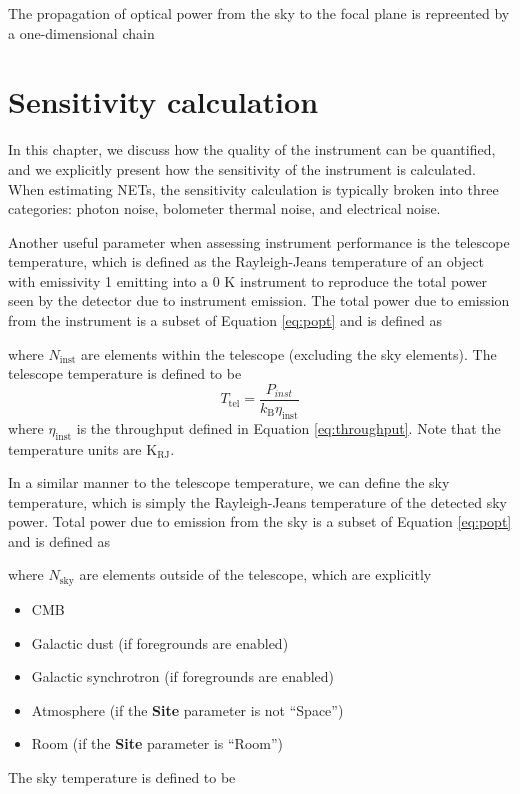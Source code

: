 The propagation of optical power from the sky to the focal plane is repreented by a one-dimensional chain


\section{Sensitivity calculation}

In this chapter, we discuss how the quality of the instrument can be quantified, and we explicitly present how the sensitivity of the instrument is calculated. When estimating NETs, the sensitivity calculation is typically broken into three categories: photon noise, bolometer thermal noise, and electrical noise.

Another useful parameter when assessing instrument performance is the telescope temperature, which is defined as the Rayleigh-Jeans temperature of an object with emissivity 1 emitting into a 0 K instrument to reproduce the total power seen by the detector due to instrument emission. The total power due to emission from the instrument is a subset of Equation \ref{eq:popt} and is defined as

where $N_{\mathrm{inst}}$ are elements within the telescope (excluding the sky elements). The telescope temperature is defined to be
\begin{equation}
    T_{\mathrm{tel}} = \frac{P_{inst}}{k_{\mathrm{B}} \eta_{\mathrm{inst}}}
    \label{eq:tel_temp}
\end{equation}
where $\eta_{\mathrm{inst}}$ is the throughput defined in Equation \ref{eq:throughput}. Note that the temperature units are $\mathrm{K_{RJ}}$.

In a similar manner to the telescope temperature, we can define the sky temperature, which is simply the Rayleigh-Jeans temperature of the detected sky power. Total power due to emission from the sky is a subset of Equation \ref{eq:popt} and is defined as

where $N_{\mathrm{sky}}$ are elements outside of the telescope, which are explicitly
\medskip
\begin{itemize}
    \item CMB
    \item Galactic dust (if foregrounds are enabled)
    \item Galactic synchrotron (if foregrounds are enabled)
    \item Atmosphere (if the \textbf{Site} parameter is not ``Space'')
    \item Room (if the \textbf{Site} parameter is ``Room'')
\end{itemize}
\medskip
The sky temperature is defined to be

